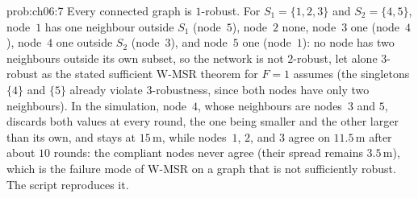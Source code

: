 \begin{sol}{prob:ch06:7}
Every connected graph is $1$-robust. For $S_1=\{1,2,3\}$ and $S_2=\{4,5\}$, node~$1$ has one neighbour outside $S_1$ (node~$5$), node~$2$ none, node~$3$ one (node~$4$), node~$4$ one outside $S_2$ (node~$3$), and node~$5$ one (node~$1$): no node has two neighbours outside its own subset, so the network is not $2$-robust, let alone $3$-robust as the stated sufficient W-MSR theorem for $F=1$ assumes (the singletons $\{4\}$ and $\{5\}$ already violate $3$-robustness, since both nodes have only two neighbours). In the simulation, node~$4$, whose neighbours are nodes~$3$ and $5$, discards both values at every round, the one being smaller and the other larger than its own, and stays at $15$\,m, while nodes~$1$, $2$, and $3$ agree on $11.5$\,m after about $10$ rounds: the compliant nodes never agree (their spread remains $3.5$\,m), which is the failure mode of W-MSR on a graph that is not sufficiently robust. The script  reproduces it.
\end{sol}
